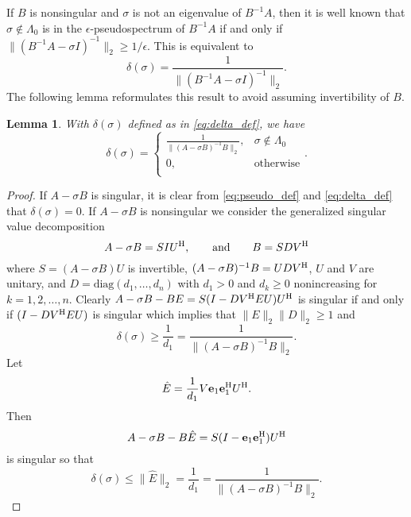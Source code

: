 \documentclass[12pt]{article}
\def\eqand{\qquad\mbox{and}\qquad}
\def\vec#1{{\bf #1}}
\def\H{{\rm H}}
\def\diag{\mbox{diag}}
\newtheorem{lemma}{Lemma}
\begin{document}
If $B$ is nonsingular and $\sigma$ is not an eigenvalue of $B^{-1}A$,
then it is well known that $\sigma\notin \Lambda_0$ is in the
$\epsilon$-pseudospectrum of $B^{-1}A$ if and only if
$\|(B^{-1}A - \sigma I)^{-1}\|_2\geq 1/\epsilon$.  This is equivalent
to
\begin{equation*}
  \delta(\sigma) = \frac{1}{\|(B^{-1}A - \sigma I)^{-1}\|_2}.
\end{equation*}
The following lemma reformulates this result to avoid assuming
invertibility of $B$.
\begin{lemma}
  \label{lm:X_norm_bound}
  With $\delta(\sigma)$ defined as in \eqref{eq:delta_def}, we have
  \begin{equation*}
     \delta(\sigma) 
     = 
     \left\{
       \begin{array}{ll}
         \frac{1}{\|(A-\sigma B)^{-1} B\|_2}, & \sigma \notin \Lambda_0 \\
         0, & \mbox{otherwise} \\
       \end{array}
     \right..
  \end{equation*}
\end{lemma}
\begin{proof}
  If $A-\sigma B$ is singular, it is clear from \eqref{eq:pseudo_def}
  and \eqref{eq:delta_def} that $\delta(\sigma)=0$.  If $A-\sigma B$
  is nonsingular we consider the generalized singular value
  decomposition
  \begin{equation*}
    A - \sigma B = S I U^\H,\eqand
    B = S D V^\H
  \end{equation*}
  where $S=(A-\sigma B)U$ is invertible,
  $(A-\sigma B)^{-1} B = U D V^\H$, $U$ and $V$ are unitary, and
  $D = \diag(d_1, \ldots, d_n)$ with $d_1 > 0$ and $d_k\geq 0$
  nonincreasing for $k=1,2,\ldots, n$.   Clearly
  $A-\sigma B - BE = S (I - D V^\H E U) U^\H$ is
  singular if and only if $(I - D V^\H E U)$ is singular which implies
  that $\|E\|_2 \|D\|_2 \geq 1$ and
  \begin{equation*}
    \delta(\sigma)
    \geq \frac{1}{d_1} =
    \frac{1}{\|(A-\sigma B)^{-1}B\|_2}.
  \end{equation*}
  Let  
  \begin{equation*}
    \hat{E} = \frac{1}{d_1}V \vec{e}_1 \vec{e}_1^\H U^\H.
  \end{equation*}
  Then
  \begin{equation*}
    A-\sigma B - B \hat{E} = S (I-\vec{e}_1 \vec{e}_1^\H) U^\H
  \end{equation*}
  is singular so that
  \begin{equation*}
    \delta(\sigma)
    \leq \|\hat{E}\|_2 
    = \frac{1}{d_1} = \frac{1}{\|(A-\sigma B)^{-1} B\|_2}.
  \end{equation*}
\end{proof}
\end{document}

